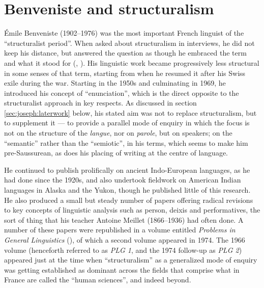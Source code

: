 \documentclass[output=paper]{langscibook}
\begin{document}
\section{Benveniste and structuralism}
\label{sec:joseph:bevenistestructuralism}

Émile Benveniste (1902--1976) was the most important French linguist of the ``structuralist period''. When asked about structuralism in interviews, he did not keep his distance, but answered the question as though he embraced the term and what it stood for (\citealt{Benveniste1968structuralisme}, \citealt{Benveniste1968langage}). His linguistic work became progressively less structural in some senses of that term, starting from when he resumed it after his Swiss exile during the war. Starting in the 1950s and culminating in 1969, he introduced his concept of ``enunciation'', which is the direct opposite to the structuralist approach in key respects. As discussed in section \ref{sec:joseph:laterwork} below, his stated aim was not to replace structuralism, but to supplement it — to provide a parallel mode of enquiry in which the focus is not on the structure of the \emph{langue}, nor on \emph{parole}, but on speakers; on the ``semantic'' rather than the ``semiotic'', in his terms, which seems to make him pre-Saussurean, as does his placing of writing at the centre of language.

He continued to publish prolifically on ancient Indo-European languages, as he had done since the 1920s, and also undertook fieldwork on American Indian languages in Alaska and the Yukon, though he published little of this research. He also produced a small but steady number of papers offering radical revisions to key concepts of linguistic analysis such as person, deixis and performatives, the sort of thing that his teacher Antoine Meillet (1866--1936) had often done. A number of these papers were republished in a volume entitled \emph{Problems in General Linguistics} (\citeyear{Benveniste196674}), of which a second volume appeared in 1974. The 1966 volume (henceforth referred to as \emph{PLG 1}, and the 1974 follow-up as \emph{PLG 2}) appeared just at the time when ``structuralism'' as a generalized mode of enquiry was getting established as dominant across the fields that comprise what in France are called the ``human sciences'', and indeed beyond.
\end{document}
